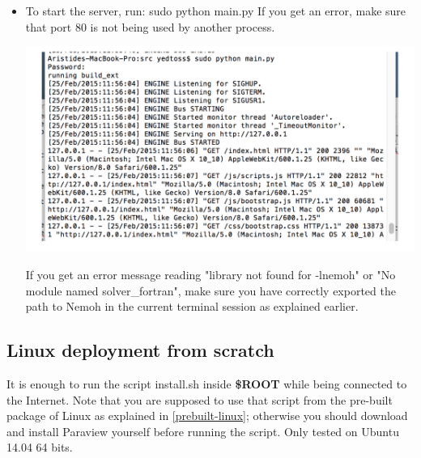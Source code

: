 \documentclass[12pt]{article}
\newcommand{\ROOT}{{\textbf{\$ROOT}}}
\begin{document}
\begin{itemize}
							
							\item
							To start the server, run:
								{\color{blue} sudo python main.py}
							If you get an error, make sure that port 80 is not being used by another process.
							
						\vspace{\abovedisplayskip}
						\begin{minipage}{\linewidth}
							\centering
							\includegraphics[scale=0.75]{img/19}
						\end{minipage}
						\vspace{\belowdisplayskip}
						
						If you get an error message reading "library not found for -lnemoh" or "No module named solver{\_}fortran", make sure you have correctly exported the path to Nemoh in the current terminal session as explained earlier.
						
						
					
					
				
			
				
	
	
\end{itemize}


\subsection{Linux deployment from scratch}

It is enough to run the script install.sh inside \ROOT{} while being connected to the Internet. Note that you are supposed to use that script from the pre-built package of Linux as explained in \ref{prebuilt-linux}; otherwise you should download and install Paraview yourself before running the script.
Only tested on Ubuntu 14.04 64 bits.
\end{document}
